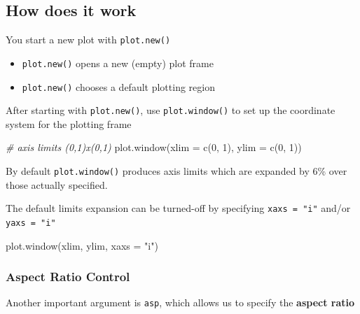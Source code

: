 \documentclass[
]{book}
\newenvironment{Shaded}{\begin{snugshade}}{\end{snugshade}}
\newcommand{\AttributeTok}[1]{\textcolor[rgb]{0.77,0.63,0.00}{#1}}
\newcommand{\CommentTok}[1]{\textcolor[rgb]{0.56,0.35,0.01}{\textit{#1}}}
\newcommand{\DecValTok}[1]{\textcolor[rgb]{0.00,0.00,0.81}{#1}}
\newcommand{\FunctionTok}[1]{\textcolor[rgb]{0.00,0.00,0.00}{#1}}
\newcommand{\NormalTok}[1]{#1}
\newcommand{\StringTok}[1]{\textcolor[rgb]{0.31,0.60,0.02}{#1}}
\begin{document}
\hypertarget{how-does-it-work}{%
\subsection{How does it work}\label{how-does-it-work}}

You start a new plot with \texttt{plot.new()}

\begin{itemize}
\item
  \texttt{plot.new()} opens a new (empty) plot frame
\item
  \texttt{plot.new()} chooses a default plotting region
\end{itemize}

After starting with \texttt{plot.new()}, use \texttt{plot.window()} to set up the coordinate
system for the plotting frame

\begin{Shaded}
\begin{Highlighting}[]
\CommentTok{\# axis limits (0,1)x(0,1)}
\FunctionTok{plot.window}\NormalTok{(}\AttributeTok{xlim =} \FunctionTok{c}\NormalTok{(}\DecValTok{0}\NormalTok{, }\DecValTok{1}\NormalTok{), }\AttributeTok{ylim =} \FunctionTok{c}\NormalTok{(}\DecValTok{0}\NormalTok{, }\DecValTok{1}\NormalTok{))}
\end{Highlighting}
\end{Shaded}

By default \texttt{plot.window()} produces axis limits which are expanded by 6\%
over those actually specified.

The default limits expansion can be turned-off by specifying \texttt{xaxs\ =\ "i"}
and/or \texttt{yaxs\ =\ "i"}

\begin{Shaded}
\begin{Highlighting}[]
\FunctionTok{plot.window}\NormalTok{(xlim, ylim, }\AttributeTok{xaxs =} \StringTok{"i"}\NormalTok{)}
\end{Highlighting}
\end{Shaded}

\hypertarget{aspect-ratio-control}{%
\subsubsection*{Aspect Ratio Control}\label{aspect-ratio-control}}

Another important argument is \texttt{asp}, which allows us to specify the
\textbf{aspect ratio}
\end{document}
